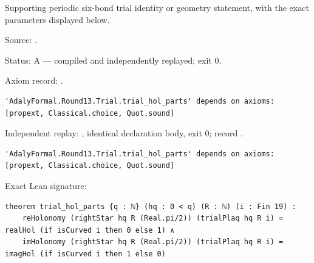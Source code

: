 \begin{theorem}[bp-411]
\label{bp-411}
\leanok
Supporting periodic six-bond trial identity or geometry statement, with the exact parameters displayed below.

\par Source: \texttt{}.
\par Status: A — compiled and independently replayed; exit 0.
\par Axiom record: \texttt{}.
\begin{verbatim}
'AdalyFormal.Round13.Trial.trial_hol_parts' depends on axioms: [propext, Classical.choice, Quot.sound]
\end{verbatim}
\par Independent replay: \texttt{}, identical declaration body, exit 0; record \texttt{}.
\begin{verbatim}
'AdalyFormal.Round13.Trial.trial_hol_parts' depends on axioms: [propext, Classical.choice, Quot.sound]
\end{verbatim}
\par Exact Lean signature:
\begin{verbatim}
theorem trial_hol_parts {q : ℕ} (hq : 0 < q) (R : ℕ) (i : Fin 19) :
    reHolonomy (rightStar hq R (Real.pi/2)) (trialPlaq hq R i) = realHol (if isCurved i then 0 else 1) ∧
    imHolonomy (rightStar hq R (Real.pi/2)) (trialPlaq hq R i) = imagHol (if isCurved i then 1 else 0)
\end{verbatim}
\end{theorem}

